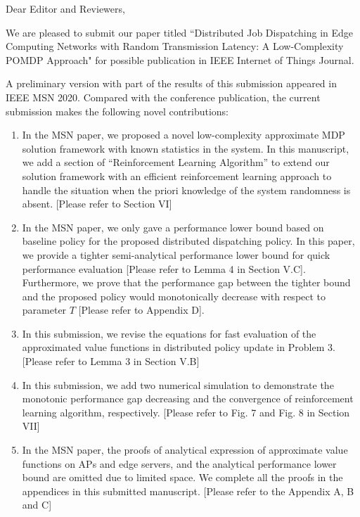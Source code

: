 \documentclass[10pt,draftclsnofoot,onecolumn]{article}
\begin{document}
Dear Editor and Reviewers,

We are pleased to submit our paper titled ``Distributed Job Dispatching in Edge Computing Networks with Random Transmission Latency: A Low-Complexity POMDP Approach" for possible publication in IEEE Internet of Things Journal.

A preliminary version with part of the results of this submission appeared in IEEE MSN 2020.
Compared with the conference publication, the current submission makes the following novel contributions:
\begin{enumerate}
\item In the MSN paper, we proposed a novel low-complexity approximate MDP solution framework with known statistics in the system.
In this manuscript, we add a section of ``Reinforcement Learning Algorithm'' to extend our solution framework with an efficient reinforcement learning approach to handle the situation when the priori knowledge of the system randomness is absent. [Please refer to Section VI]

\item In the MSN paper, we only gave a performance lower bound based on baseline policy for the proposed distributed dispatching policy. In this paper, we provide a tighter semi-analytical performance lower bound for quick performance evaluation [Please refer to Lemma 4 in Section V.C]. 
Furthermore, we prove that the performance gap between the tighter bound and the proposed policy would monotonically decrease with respect to parameter $T$ [Please refer to Appendix D]. 

\item In this submission, we revise the equations for fast evaluation of the approximated value functions in distributed policy update in Problem 3. [Please refer to Lemma 3 in Section V.B]

\item In this submission, we add two numerical simulation to demonstrate the monotonic performance gap decreasing and the convergence of reinforcement learning algorithm, respectively. [Please refer to Fig. 7 and Fig. 8 in Section VII]

\item In the MSN paper, the proofs of analytical expression of approximate value functions on APs and edge servers, and the analytical performance lower bound are omitted due to limited space. We complete all the proofs in the appendices in this submitted manuscript. [Please refer to the Appendix A, B and C]


\end{enumerate}
\end{document}
